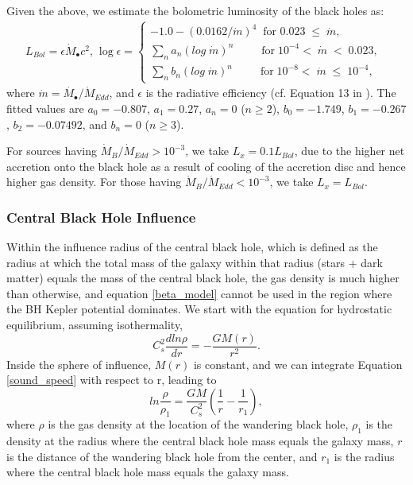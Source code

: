 \documentclass[fleqn,usenatbib,useAMS]{mnras}
\begin{document}
Given the above, we estimate the bolometric luminosity of the black holes as:
\begin{subequations}
    \begin{equation}\label{bol_lum}
        L_{Bol} = \epsilon\dot{M}_{\bullet}c^2,
    \end{equation}
    \begin{equation}\label{rad_eff}
        \begin{split}
        \text{log}\;\epsilon = \begin{cases}
                        -1.0-(0.0162/\dot{m})^{4}\;\;\text{for 0.023}\;\leq\;\dot{m}, \\
                        \sum_{n}{}a_{n}(log\;\dot{m})^{n}\;\;\;\;\;\;\;\;\;\text{for}\;10^{-4} <\;\dot{m}\;<\;0.023, \\
                        \sum_{n}{}b_{n}(log\;\dot{m})^{n}\;\;\;\;\;\;\;\;\;\text{for}\;10^{-8} <\;\dot{m}\;\leq\;10^{-4},
                               \end{cases}
        \end{split}
    \end{equation}
\end{subequations}
where $\dot{m}=\dot{M_{\bullet}}/\dot{M}_{Edd}$, and $\epsilon$ is the radiative efficiency (cf. Equation 13 in \citet{2019MNRAS.486.5377I}).  The fitted values are $a_0=-0.807$, $a_1=0.27$, $a_n=0$ ($n\geq2$), $b_0=-1.749$, $b_1=-0.267$, $b_2=-0.07492$, and $b_n=0$ ($n\geq3$).

For sources having $\dot{M}_B/\dot{M}_{Edd} > 10^{-3}$, we take $L_x=0.1L_{Bol}$, due to the higher net accretion onto the black hole as a result of cooling of the accretion disc and hence higher gas density.  For those having $\dot{M}_B/\dot{M}_{Edd} < 10^{-3}$, we take $L_x=L_{Bol}$.


\subsubsection{Central Black Hole Influence}
Within the influence radius of the central black hole, which is defined as the radius at which the total mass of the galaxy within that radius (stars + dark matter) equals the mass of the central black hole, the gas density is much higher than otherwise, and equation \eqref{beta_model} cannot be used in the region where the BH Kepler potential dominates.  We start with the equation for hydrostatic equilibrium, assuming isothermality,
\begin{equation} \label{sound_speed}
    C_{s}^2\frac{dln\rho}{dr}= -\frac{GM(r)}{r^2}.
\end{equation}
Inside the sphere of influence, $M(r)$ is constant, and we can integrate Equation \eqref{sound_speed} with respect to r, leading to 
\begin{equation}
    ln\frac{\rho}{\rho_1} = \frac{GM}{C_{s}^2}\left(\frac{1}{r} - \frac{1}{r_1}\right),
\end{equation}
where $\rho$ is the gas density at the location of the wandering black hole, $\rho_1$ is the density at the radius where the central black hole mass equals the galaxy mass, $r$ is the distance of the wandering black hole from the center, and $r_1$ is the radius where the central black hole mass equals the galaxy mass.
\end{document}
